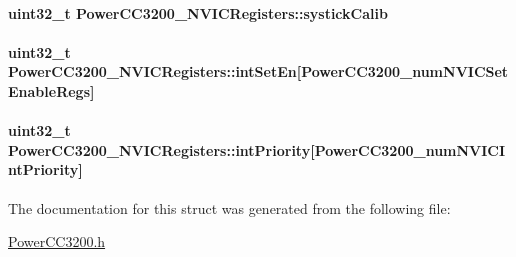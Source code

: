 \paragraph[{systick\+Calib}]{\setlength{\rightskip}{0pt plus 5cm}uint32\+\_\+t Power\+C\+C3200\+\_\+\+N\+V\+I\+C\+Registers\+::systick\+Calib}\label{struct_power_c_c3200___n_v_i_c_registers_a92ef14f85fd6d8c1a2ca1838aca7d33c}
\paragraph[{int\+Set\+En}]{\setlength{\rightskip}{0pt plus 5cm}uint32\+\_\+t Power\+C\+C3200\+\_\+\+N\+V\+I\+C\+Registers\+::int\+Set\+En\mbox{[}{\bf Power\+C\+C3200\+\_\+num\+N\+V\+I\+C\+Set\+Enable\+Regs}\mbox{]}}\label{struct_power_c_c3200___n_v_i_c_registers_a8b1f7269c5d56f88a03b34431e2982d6}
\paragraph[{int\+Priority}]{\setlength{\rightskip}{0pt plus 5cm}uint32\+\_\+t Power\+C\+C3200\+\_\+\+N\+V\+I\+C\+Registers\+::int\+Priority\mbox{[}{\bf Power\+C\+C3200\+\_\+num\+N\+V\+I\+C\+Int\+Priority}\mbox{]}}\label{struct_power_c_c3200___n_v_i_c_registers_aa01c82b18988c8453821515fab04412a}


The documentation for this struct was generated from the following file\+:\begin{DoxyCompactItemize}
\item 
\hyperlink{_power_c_c3200_8h}{Power\+C\+C3200.\+h}\end{DoxyCompactItemize}
